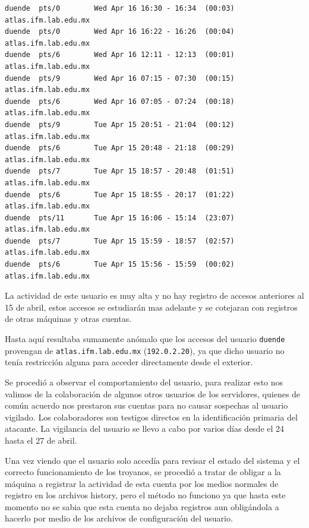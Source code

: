 \begin{lstlisting}[style=terminal]
duende  pts/0        Wed Apr 16 16:30 - 16:34  (00:03)     atlas.ifm.lab.edu.mx
duende  pts/0        Wed Apr 16 16:22 - 16:26  (00:04)     atlas.ifm.lab.edu.mx
duende  pts/6        Wed Apr 16 12:11 - 12:13  (00:01)     atlas.ifm.lab.edu.mx
duende  pts/9        Wed Apr 16 07:15 - 07:30  (00:15)     atlas.ifm.lab.edu.mx
duende  pts/6        Wed Apr 16 07:05 - 07:24  (00:18)     atlas.ifm.lab.edu.mx
duende  pts/9        Tue Apr 15 20:51 - 21:04  (00:12)     atlas.ifm.lab.edu.mx
duende  pts/6        Tue Apr 15 20:48 - 21:18  (00:29)     atlas.ifm.lab.edu.mx
duende  pts/7        Tue Apr 15 18:57 - 20:48  (01:51)     atlas.ifm.lab.edu.mx
duende  pts/6        Tue Apr 15 18:55 - 20:17  (01:22)     atlas.ifm.lab.edu.mx
duende  pts/11       Tue Apr 15 16:06 - 15:14  (23:07)     atlas.ifm.lab.edu.mx
duende  pts/7        Tue Apr 15 15:59 - 18:57  (02:57)     atlas.ifm.lab.edu.mx
duende  pts/6        Tue Apr 15 15:56 - 15:59  (00:02)     atlas.ifm.lab.edu.mx

\end{lstlisting}

\vspace{1em}

La actividad de este usuario es muy alta y no hay registro de accesos
anteriores al 15 de abril, estos accesos se estudiarán mas adelante y
se cotejaran con registros de otras máquinas y otras cuentas.

 Hasta aquí resultaba sumamente anómalo que los accesos del usuario \texttt{duende}
provengan de \nolinkurl{atlas.ifm.lab.edu.mx} (\texttt{192.0.2.20}), ya que dicho
usuario no tenía restricción alguna para acceder directamente desde el exterior.

 Se procedió a observar el comportamiento del usuario, para realizar
esto nos valimos de la colaboración de algunos otros usuarios de los
servidores, quienes de común acuerdo nos prestaron sus cuentas para no
causar sospechas al usuario vigilado. Los colaboradores son testigos
directos en la identificación primaria del atacante. La vigilancia 
del usuario se llevo a cabo por varios días desde el 24
hasta el 27 de abril.
 
Una vez viendo que el usuario solo accedía para revisar el estado
del sistema y el correcto funcionamiento de los troyanos, se procedió
a tratar de obligar a la máquina a registrar la actividad de esta
cuenta por los medios normales de registro en los archivos history,
pero el método no funciono ya que hasta este momento no se sabia que
esta cuenta no dejaba registros aun obligándola a hacerlo por medio
de los archivos de configuración del usuario.

